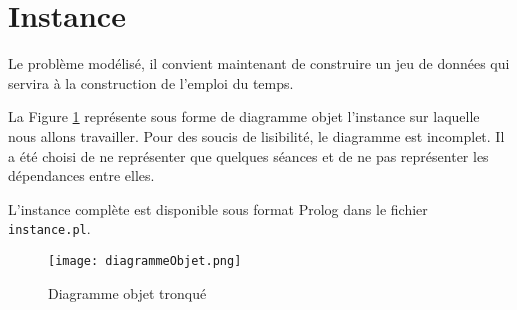 \section{Instance}

Le problème modélisé, il convient maintenant de construire un jeu de données qui
servira à la construction de l'emploi du temps.

La Figure \ref{fig:objet} représente sous forme de diagramme objet l'instance
sur laquelle nous allons travailler. Pour des soucis de lisibilité, le diagramme
est incomplet. Il a été choisi de ne représenter que quelques séances et de ne
pas représenter les dépendances entre elles.

L'instance complète est disponible sous format Prolog dans le fichier
\texttt{instance.pl}.

\begin{landscape}

    \begin{figure}[t]
        \texttt{[image: diagrammeObjet.png]}
            \caption{\label{fig:objet} Diagramme objet tronqué}
    \end{figure}

\end{landscape}

